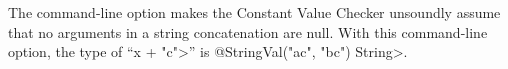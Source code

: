 The  command-line option makes the
Constant Value Checker unsoundly assume that no arguments in a string
concatenation are null.
With this command-line option, the type of ``\<x + "c">'' is
\<@StringVal("ac", "bc") String>.

